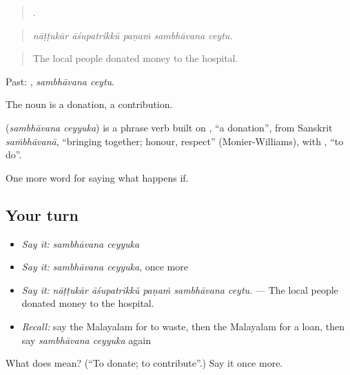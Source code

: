 \begin{quote}
    .
\end{quote}

\begin{quote}
\emph{nāṭṭukār āśupatrikkŭ paṇaṁ sambhāvana ceytu.}
\end{quote}

\begin{quote}
The local people donated money to the hospital.
\end{quote}

Past:  , \emph{sambhāvana ceytu}.

The noun  is a donation, a contribution.

\begin{cousinweb}
\textbf{ } (\emph{sambhāvana ceyyuka}) is a phrase verb built on , \textquotedblleft{}a donation\textquotedblright{}, from Sanskrit \emph{saṁbhāvanā}, \textquotedblleft{}bringing together; honour, respect\textquotedblright{} (Monier-Williams), with , \textquotedblleft{}to do\textquotedblright{}.
\end{cousinweb}

\begin{grammarlens}[title={What you've built}]
One more word for saying what happens if.
\end{grammarlens}

\subsection*{Your turn}
\begin{itemize}
\raggedright
  \item \emph{Say it:} \emph{sambhāvana ceyyuka}
  \item \emph{Say it:} \emph{sambhāvana ceyyuka}, once more
  \item \emph{Say it:} \emph{nāṭṭukār āśupatrikkŭ paṇaṁ sambhāvana ceytu.} — The local people donated money to the hospital.
  \item \emph{Recall:} say the Malayalam for to waste, then the Malayalam for a loan, then say \emph{sambhāvana ceyyuka} again
\end{itemize}

\begin{tcolorbox}[breakable,colback=teal!4,colframe=teal!35!black,title={Before you move on}]
What does   mean? (\textquotedblleft{}To donate; to contribute\textquotedblright{}.) Say it once more.
\end{tcolorbox}
